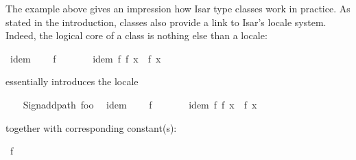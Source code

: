 \begin{isabellebody}
{}
\isamarkuptrue%
%
\isamarkuptrue%
%
\begin{isamarkuptext}%
The example above gives an impression how Isar type classes work
  in practice.  As stated in the introduction, classes also provide
  a link to Isar's locale system.  Indeed, the logical core of a class
  is nothing else than a locale:%
\end{isamarkuptext}%
\isamarkuptrue%
%
\isadelimquote
%
\endisadelimquote
%
\isatagquote
{}\isamarkupfalse%
\ idem\ {\isacharequal}\isanewline
\ \ \ f\ {\isacharcolon}{\isacharcolon}\ {\isachardoublequoteopen}{\isasymalpha}\ {\isasymRightarrow}\ {\isasymalpha}{\isachardoublequoteclose}\isanewline
\ \ \ idem{\isacharcolon}\ {\isachardoublequoteopen}f\ {\isacharparenleft}f\ x{\isacharparenright}\ {\isacharequal}\ f\ x{\isachardoublequoteclose}%
\endisatagquote
{\isafoldquote}%
%
\isadelimquote
%
\endisadelimquote
%
\begin{isamarkuptext}%
\noindent essentially introduces the locale%
\end{isamarkuptext}%
\isamarkuptrue%
%
\isadeliminvisible
\ %
\endisadeliminvisible
%
\isataginvisible
{}\isamarkupfalse%
\ {\isacharverbatimopen}\ Sign{\isachardot}add{\isacharunderscore}path\ {\isachardoublequote}foo{\isachardoublequote}\ {\isacharverbatimclose}%
\endisataginvisible
{\isafoldinvisible}%
%
\isadeliminvisible
%
\endisadeliminvisible
\isanewline
%
\isadelimquote
\isanewline
%
\endisadelimquote
%
\isatagquote
{}\isamarkupfalse%
\ idem\ {\isacharequal}\isanewline
\ \ \ f\ {\isacharcolon}{\isacharcolon}\ {\isachardoublequoteopen}{\isasymalpha}\ {\isasymRightarrow}\ {\isasymalpha}{\isachardoublequoteclose}\isanewline
\ \ \ idem{\isacharcolon}\ {\isachardoublequoteopen}f\ {\isacharparenleft}f\ x{\isacharparenright}\ {\isacharequal}\ f\ x{\isachardoublequoteclose}%
\endisatagquote
{\isafoldquote}%
%
\isadelimquote
%
\endisadelimquote
%
\begin{isamarkuptext}%
\noindent together with corresponding constant(s):%
\end{isamarkuptext}%
\isamarkuptrue%
%
\isadelimquote
%
\endisadelimquote
%
\isatagquote
{}\isamarkupfalse%
\ f\ {\isacharcolon}{\isacharcolon}\ {\isachardoublequoteopen}{\isasymalpha}\ {\isasymRightarrow}\ {\isasymalpha}{\isachardoublequoteclose}%
\endisatagquote
{\isafoldquote}%
%
\isadelimquote
%
\endisadelimquote
%
\begin{isamarkuptext}%

\end{isamarkuptext}
\end{isabellebody}
